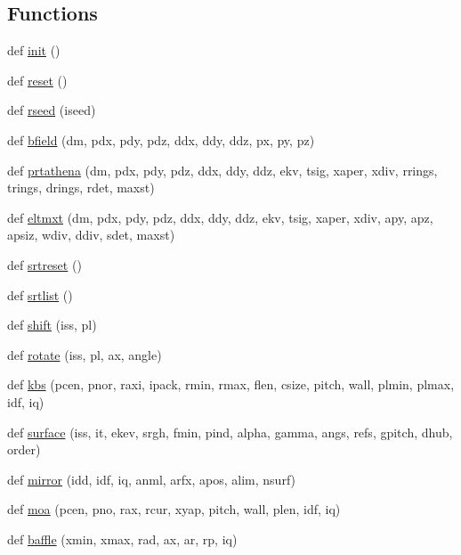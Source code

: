 \subsection*{Functions}
\begin{DoxyCompactItemize}
\item 
def \hyperlink{namespacexsrt_ad0ebdb12a4c5dca8c024ab22e44d9caf}{init} ()
\item 
def \hyperlink{namespacexsrt_abf9930353fb8dbb6e2a53a8c0894b53a}{reset} ()
\item 
def \hyperlink{namespacexsrt_ac97fe76bbf9896cb58566d4c420800ac}{rseed} (iseed)
\item 
def \hyperlink{namespacexsrt_a2f1930d6670df36052806cb01afad58c}{bfield} (dm, pdx, pdy, pdz, ddx, ddy, ddz, px, py, pz)
\item 
def \hyperlink{namespacexsrt_a61fb0678aef45eb10653ef734566d879}{prtathena} (dm, pdx, pdy, pdz, ddx, ddy, ddz, ekv, tsig, xaper, xdiv, rrings, trings, drings, rdet, maxst)
\item 
def \hyperlink{namespacexsrt_a55e0e47823b7992af486004eac82f724}{eltmxt} (dm, pdx, pdy, pdz, ddx, ddy, ddz, ekv, tsig, xaper, xdiv, apy, apz, apsiz, wdiv, ddiv, sdet, maxst)
\item 
def \hyperlink{namespacexsrt_ae664e35bbb9605ccff3308f416c4d56a}{srtreset} ()
\item 
def \hyperlink{namespacexsrt_a9e999fe3e5a9e7bacfd88e095433be67}{srtlist} ()
\item 
def \hyperlink{namespacexsrt_a140d1f2b7ed0aed3efefd16a28ff63e7}{shift} (iss, pl)
\item 
def \hyperlink{namespacexsrt_a3fc1f652f58f672dcde6a8e3ec6665c7}{rotate} (iss, pl, ax, angle)
\item 
def \hyperlink{namespacexsrt_a8290f46ca02ebac3054ee608ea998789}{kbs} (pcen, pnor, raxi, ipack, rmin, rmax, flen, csize, pitch, wall, plmin, plmax, idf, iq)
\item 
def \hyperlink{namespacexsrt_a31e150698932706543329efe1c26b733}{surface} (iss, it, ekev, srgh, fmin, pind, alpha, gamma, angs, refs, gpitch, dhub, order)
\item 
def \hyperlink{namespacexsrt_a9c2e7251116c1a1d304280b350bf5b2d}{mirror} (idd, idf, iq, anml, arfx, apos, alim, nsurf)
\item 
def \hyperlink{namespacexsrt_af06ddcb58108434aa5ee18338fe0d0d1}{moa} (pcen, pno, rax, rcur, xyap, pitch, wall, plen, idf, iq)
\item 
def \hyperlink{namespacexsrt_a57358b4b808cd71955e361572d259375}{baffle} (xmin, xmax, rad, ax, ar, rp, iq)

\end{DoxyCompactItemize}
